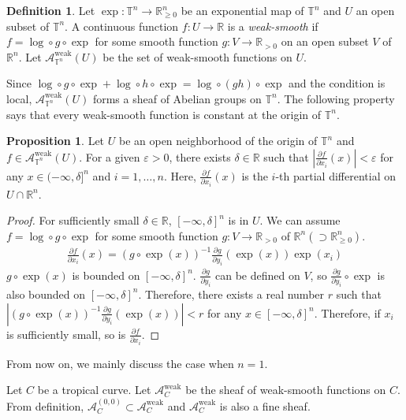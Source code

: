 \documentclass[a4paper,dvipdfmx,reqno,12pt]{amsart}
\theoremstyle{definition}
\newtheorem{definition}[theorem]{Definition}
\newtheorem{proposition}[theorem]{Proposition}
\newcommand{\vep}{\varepsilon}%
\newcommand{\opn}[1]{\operatorname{#1}}
\numberwithin{equation}{section}
\begin{document}
\begin{definition}
Let $\opn{exp}\colon \mathbb{T}^{n}\to 
\mathbb{R}_{\geq 0}^{n}$ be an exponential map of 
$\mathbb{T}^{n}$ and $U$ an open subset of 
$\mathbb{T}^{n}$.
A continuous function $f\colon U\to \mathbb{R}$
is a \emph{weak-smooth} if 
$f=\opn{log}\circ g\circ \opn{exp}$ for some 
smooth function $g\colon V\to \mathbb{R}_{>0}$ on 
an open subset $V$ of $\mathbb{R}^{n}$.
Let $\mathcal{A}_{\mathbb{T}^{n}}^{\mathrm{weak}}(U)$ 
be the set of weak-smooth functions on $U$.
\end{definition}
Since $\opn{log}\circ g\circ\opn{exp}+\opn{log}\circ h
\circ \opn{exp}=\opn{log}\circ(gh)\circ\opn{exp}$ and 
the condition is local, 
$\mathcal{A}_{\mathbb{T}^{n}}^{\opn{weak}}(U)$ forms a 
sheaf of Abelian groups on $\mathbb{T}^{n}$. 
The following property says that every weak-smooth 
function is constant at the origin of $\mathbb{T}^{n}$.
\begin{proposition}
Let $U$ be an open neighborhood of the origin of 
$\mathbb{T}^{n}$ and 
 $f\in \mathcal{A}_{\mathbb{T}^{n}}^{\mathrm{weak}}(U)$.
For a given $\vep >0$, there exists $\delta\in \mathbb{R}$
such that $|\frac{\partial f}{\partial x_i}(x)|<\vep$
for any $x \in (-\infty,\delta]^{n}$ and $i=1,\ldots,n$. 
Here, $\frac{\partial f}{\partial x_i}(x)$ is the $i$-th partial 
differential on $U\cap \mathbb{R}^{n}$.
\end{proposition}
\begin{proof}
For sufficiently small $\delta\in \mathbb{R}$, 
$[-\infty,\delta]^{n}$ is in $U$. 
We can assume $f=\opn{log}\circ g\circ \opn{exp}$ for
some smooth function 
$g\colon V\to \mathbb{R}_{>0}$ of $\mathbb{R}^{n} 
(\supset \mathbb{R}_{\geq 0}^{n})$.
\begin{align}
\frac{\partial f}{\partial x_i}(x)=(g\circ \opn{exp}(x))^{-1} 
\frac{\partial g}{\partial y_i}(\opn{exp}(x))\opn{exp}(x_i)
\end{align}
$g\circ \opn{exp}(x)$ is bounded on $[-\infty,\delta]^{n}$.
$\frac{\partial g}{\partial y_i}$ can be defined 
on $V$, so $\frac{\partial g}{\partial y_i}\circ \opn{exp}$
is also bounded on $[-\infty,\delta]^{n}$.
Therefore, there exists a real number $r$ such that
$|(g\circ \opn{exp}(x))^{-1} 
\frac{\partial g}{\partial y_i}(\opn{exp}(x))|<r$ for any 
$x\in [-\infty,\delta]^{n}$.
Therefore, if $x_i$ is sufficiently small, so is 
$\frac{\partial f}{\partial x_i}$. 
\end{proof}
From now on, we mainly discuss the case when $n=1$.

Let $C$ be a tropical curve. 
Let $\mathcal{A}_C^{\opn{weak}}$ be the sheaf 
of weak-smooth functions on $C$. From definition,
$\mathcal{A}_C^{(0,0)}\subset \mathcal{A}_C^{\opn{weak}}$
and $\mathcal{A}_C^{\opn{weak}}$ is also a fine sheaf.
\end{document}
